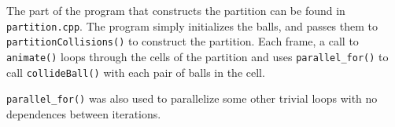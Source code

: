 \documentclass[11pt]{article}
\begin{document}
The part of the program that constructs the partition can be found in \texttt{partition.cpp}.
The program simply initializes the balls, and passes them to \texttt{partitionCollisions()} to construct the partition.
Each frame, a call to \texttt{animate()} loops through the cells of the partition and uses \texttt{parallel\_for()} to call \texttt{collideBall()} with each pair of balls in the cell.

\texttt{parallel\_for()} was also used to parallelize some other trivial loops with no dependences between iterations.
\end{document}
